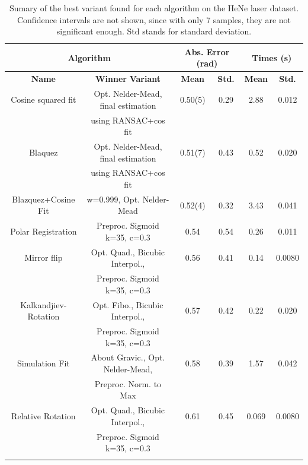 \documentclass[11pt, a4paper, twoside]{article} %
\begin{document}
\begin{table}[h!]
{\small 
\center
\caption{Sumary of the best variant found for each algorithm on the HeNe laser dataset. Confidence intervals are not shown, since with only 7 samples, they are not significant enough. Std stands for standard deviation. }\label{tab:resExp}
\hspace{-0.1cm}\begin{tabular}{c|c|cc|cc}
\toprule
 \multicolumn{2}{c|}{\bf Algorithm} &  \multicolumn{2}{|c|}{\bf \small Abs. Error (rad)} & \multicolumn{2}{|c}{\bf Times (s)} \\ \midrule \midrule
{\bf                     Name} &                          {\bf Winner} {\bf Variant} &  {\bf Mean} &  {\bf Std.} & {\bf Mean} & {\bf Std.}\\
\bottomrule\rule{0pt}{4mm}{}
    Cosine squared fit &  {\small  Opt. Nelder-Mead, final estimation } &  0.50(5) &  0.29 &  2.88 &  0.012 \\
                       &                   {\small using RANSAC+cos fit }&          &         &          &          \\ \hline\rule{0pt}{4mm}{}
               Blaquez &  {\small  Opt. Nelder-Mead, final estimation } &  0.51(7) & 0.43 &  0.52 &  0.020 \\
                       &                   {\small using RANSAC+cos fit }&          &         &          &          \\ \hline\rule{0pt}{4mm}{}
   Blazquez+Cosine Fit &              {\small w=0.999, Opt. Nelder-Mead} &  0.52(4) & 0.32 &  3.43 &  0.041 \\ \hline\rule{0pt}{4mm}{}
    Polar Registration &     {\small      Preproc. Sigmoid k=35, c=0.3} &  0.54 & 0.54 &  0.26 &  0.011 \\ \hline\rule{0pt}{4mm}{}
           Mirror flip &     {\small    Opt. Quad., Bicubic Interpol., }&  0.56 & 0.41 &  0.14 &  0.0080 \\
                       &        {\small   Preproc. Sigmoid k=35, c=0.3 }&          &         &          &          \\ \hline\rule{0pt}{4mm}{}
  Kalkandjiev-Rotation &      {\small  Opt. Fibo., Bicubic Interpol.,}  &  0.57 & 0.42 &  0.22 &  0.020 \\
                       &          {\small Preproc. Sigmoid k=35, c=0.3 } &          &         &          &          \\ \hline\rule{0pt}{4mm}{}
        Simulation Fit & {\small About Gravic., Opt. Nelder-Mead,}  &  0.58 & 0.39 &  1.57 &  0.042 \\
                       &                  {\small Preproc. Norm. to Max }&          &         &          &          \\ \hline\rule{0pt}{4mm}{}
     Relative Rotation &    {\small     Opt. Quad., Bicubic Interpol.}, &  0.61 & 0.45 &  0.069 &  0.0080 \\
                       &      {\small     Preproc. Sigmoid k=35, c=0.3 }&          &         &          &          \\ \hline\rule{0pt}{4mm}{}
                       

\end{tabular}}
\end{table}
\end{document}
